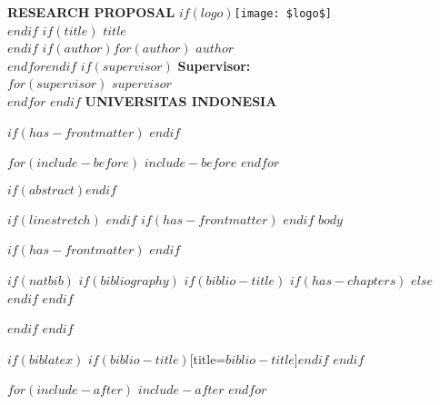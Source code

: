 \documentclass[]{report}
\begin{document}
\begin{titlepage}
\begin{center}
\textbf{RESEARCH PROPOSAL}
\vfill
$if(logo)$\texttt{[image: \$logo\$]} \\
\vspace{3em}$endif$
$if(title)$
\textbf{\uppercase{$title$}}\\
\vspace{1em}
$endif$
$if(author)$$for(author)$
$author$\\
$endfor$$endif$
$if(supervisor)$
\textbf{Supervisor:}\\
  $for(supervisor)$
  $supervisor$\\
  $endfor$
$endif$
\vfill
\textbf{\uppercase{Universitas Indonesia}}
\end{center}
\end{titlepage}

$if(has-frontmatter)$
\frontmatter
$endif$

$for(include-before)$
$include-before$
$endfor$

$if(abstract)$$endif$

\begin{spacing}{1}
\setcounter{tocdepth}{1}
\tableofcontents
\end{spacing}

$if(linestretch)$
$endif$
$if(has-frontmatter)$
\mainmatter
$endif$
$body$

$if(has-frontmatter)$
\backmatter
$endif$

$if(natbib)$
$if(bibliography)$
$if(biblio-title)$
$if(has-chapters)$
\renewcommand\bibname{$biblio-title$}
$else$
\renewcommand\refname{$biblio-title$}
$endif$
$endif$

$endif$
$endif$

$if(biblatex)$
\printbibliography$if(biblio-title)$[title=$biblio-title$]$endif$
$endif$

$for(include-after)$
$include-after$
$endfor$
\end{document}
